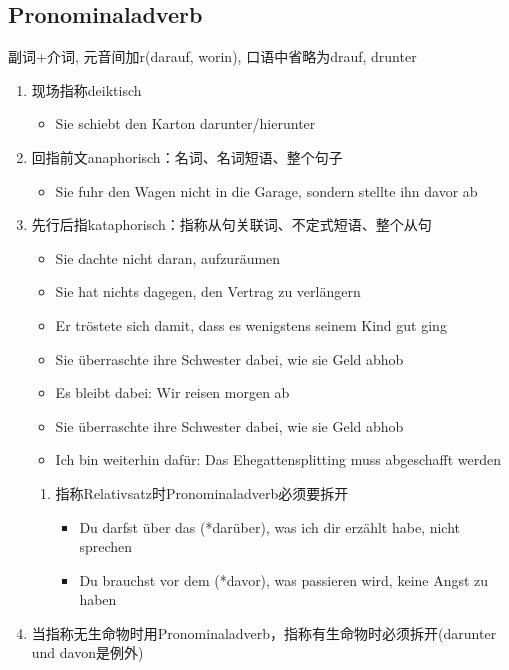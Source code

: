 \documentclass[UTF8]{report}
\begin{document}
\subsection{Pronominaladverb}
副词+介词, 元音间加r(darauf, worin), 口语中省略为drauf, drunter

\begin{enumerate}
    \item 现场指称deiktisch
    \begin{itemize}
        \item Sie schiebt den Karton darunter/hierunter
    \end{itemize}
    \item 回指前文anaphorisch：名词、名词短语、整个句子
    \begin{itemize}
        \item Sie fuhr den Wagen nicht in die Garage, sondern stellte ihn davor ab
    \end{itemize}
    \item 先行后指kataphorisch：指称从句关联词、不定式短语、整个从句
    \begin{itemize}
        \item Sie dachte nicht daran, aufzuräumen
        \item Sie hat nichts dagegen, den Vertrag zu verlängern
        \item Er tröstete sich damit, dass es wenigstens seinem Kind gut ging
        \item Sie überraschte ihre Schwester dabei, wie sie Geld abhob
        \item Es bleibt dabei: Wir reisen morgen ab
        \item Sie überraschte ihre Schwester dabei, wie sie Geld abhob
        \item Ich bin weiterhin dafür: Das Ehegattensplitting muss abgeschafft werden
    \end{itemize}
    \begin{enumerate}
        \item 指称Relativsatz时Pronominaladverb必须要拆开
        \begin{itemize}
            \item Du darfst über das (*darüber), was ich dir erzählt habe, nicht sprechen
            \item Du brauchst vor dem (*davor), was passieren wird, keine Angst zu haben
        \end{itemize}
    \end{enumerate}
    \item 当指称无生命物时用Pronominaladverb，指称有生命物时必须拆开(darunter und davon是例外)

\end{enumerate}
\end{document}
